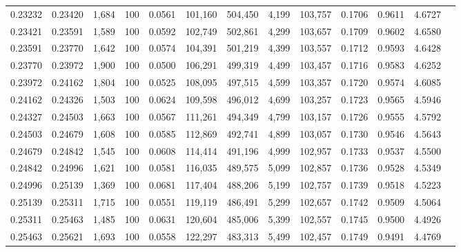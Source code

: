 \begin{tabular}{rrrrrrrrrrrrr}
0.23232 & 0.23420 & 1,684 & 100 &                                     0.0561 & 101,160 & 504,450 &   4,199 & 103,757 & 0.1706 & 0.9611 & 4.6727 \\
0.23421 & 0.23591 & 1,589 & 100 &                                     0.0592 & 102,749 & 502,861 &   4,299 & 103,657 & 0.1709 & 0.9602 & 4.6580 \\
0.23591 & 0.23770 & 1,642 & 100 &                                     0.0574 & 104,391 & 501,219 &   4,399 & 103,557 & 0.1712 & 0.9593 & 4.6428 \\
0.23770 & 0.23972 & 1,900 & 100 &                                     0.0500 & 106,291 & 499,319 &   4,499 & 103,457 & 0.1716 & 0.9583 & 4.6252 \\
0.23972 & 0.24162 & 1,804 & 100 &                                     0.0525 & 108,095 & 497,515 &   4,599 & 103,357 & 0.1720 & 0.9574 & 4.6085 \\
0.24162 & 0.24326 & 1,503 & 100 &                                     0.0624 & 109,598 & 496,012 &   4,699 & 103,257 & 0.1723 & 0.9565 & 4.5946 \\
0.24327 & 0.24503 & 1,663 & 100 &                                     0.0567 & 111,261 & 494,349 &   4,799 & 103,157 & 0.1726 & 0.9555 & 4.5792 \\
0.24503 & 0.24679 & 1,608 & 100 &                                     0.0585 & 112,869 & 492,741 &   4,899 & 103,057 & 0.1730 & 0.9546 & 4.5643 \\
0.24679 & 0.24842 & 1,545 & 100 &                                     0.0608 & 114,414 & 491,196 &   4,999 & 102,957 & 0.1733 & 0.9537 & 4.5500 \\
0.24842 & 0.24996 & 1,621 & 100 &                                     0.0581 & 116,035 & 489,575 &   5,099 & 102,857 & 0.1736 & 0.9528 & 4.5349 \\
0.24996 & 0.25139 & 1,369 & 100 &                                     0.0681 & 117,404 & 488,206 &   5,199 & 102,757 & 0.1739 & 0.9518 & 4.5223 \\
0.25139 & 0.25311 & 1,715 & 100 &                                     0.0551 & 119,119 & 486,491 &   5,299 & 102,657 & 0.1742 & 0.9509 & 4.5064 \\
0.25311 & 0.25463 & 1,485 & 100 &                                     0.0631 & 120,604 & 485,006 &   5,399 & 102,557 & 0.1745 & 0.9500 & 4.4926 \\
0.25463 & 0.25621 & 1,693 & 100 &                                     0.0558 & 122,297 & 483,313 &   5,499 & 102,457 & 0.1749 & 0.9491 & 4.4769 \\

\end{tabular}
